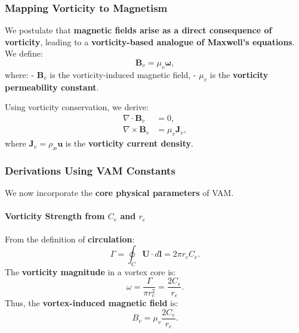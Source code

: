     \subsubsection*{Mapping Vorticity to Magnetism}
    We postulate that \textbf{magnetic fields arise as a direct consequence of vorticity}, leading to a \textbf{vorticity-based analogue of Maxwell’s equations}. We define:
    \begin{equation}
        \boldsymbol{B}_v = \mu_v \boldsymbol{\omega},
    \end{equation}
    where:
    - \( \boldsymbol{B}_v \) is the vorticity-induced magnetic field,
    - \( \mu_v \) is the \textbf{vorticity permeability constant}.

    Using vorticity conservation, we derive:
    \begin{align}
        \nabla \cdot \boldsymbol{B}_v &= 0, \\
        \nabla \times \boldsymbol{B}_v &= \mu_v \boldsymbol{J}_v,
    \end{align}
    where \( \boldsymbol{J}_v = \rho_{\text{\ae}} \boldsymbol{u} \) is the \textbf{vorticity current density}.

    \subsubsection*{Derivations Using VAM Constants}
    We now incorporate the \textbf{core physical parameters} of VAM.

    \paragraph*{Vorticity Strength from \( C_e \) and \( r_c \)}
    From the definition of \textbf{circulation}:
    \begin{equation}
        \Gamma = \oint_C \mathbf{U} \cdot d\mathbf{l} = 2\pi r_c C_e.
    \end{equation}
    The \textbf{vorticity magnitude} in a vortex core is:
    \begin{equation}
        \omega = \frac{\Gamma}{\pi r_c^2} = \frac{2 C_e}{r_c}.
    \end{equation}
    Thus, the \textbf{vortex-induced magnetic field} is:
    \begin{equation}
        B_v = \mu_v \frac{2 C_e}{r_c}.
    \end{equation}

